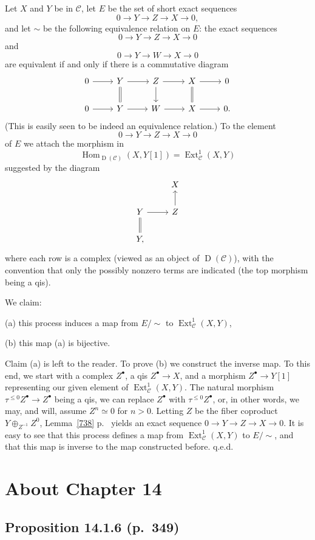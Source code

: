 \documentclass[12pt]{article}
\theoremstyle{remark}
\theoremstyle{definition}
\newcommand{\oo}{\operatorname}
\newcommand{\C}{\mathcal C}
\DeclareMathOperator{\Ext}{Ext}
\DeclareMathOperator{\Hom}{Hom}
\begin{document}
Let $X$ and $Y$ be in $\C$, let $E$ be the set of short exact sequences 
$$
0\to Y\to Z\to X\to0,
$$ 
and let $\sim$ be the following equivalence relation on $E$: the exact sequences 
$$
0\to Y\to Z\to X\to0
$$ 
and 
$$
0\to Y\to W\to X\to0
$$ 
are equivalent if and only if there is a commutative diagram 
$$
\begin{tikzcd}
0\ar{r}&Y\ar[equal]{d}\ar{r}&Z\ar{d}\ar{r}&X\ar[equal]{d}\ar{r}&0\\ 
0\ar{r}&Y\ar{r}&W\ar{r}&X\ar{r}&0.
\end{tikzcd}
$$ 
(This is easily seen to be indeed an equivalence relation.) To the element 
$$
0\to Y\to Z\to X\to0
$$ 
of $E$ we attach the morphism in 
$$
\Hom_{\oo D(\C)}(X,Y[1])=\Ext^1_\C(X,Y)
$$ 
suggested by the diagram 
$$
\begin{tikzcd}
{}&X\\ 
Y\ar[equal]{d}\ar{r}&Z\ar{u}\\ 
Y,
\end{tikzcd}
$$ 
where each row is a complex (viewed as an object of $\oo D(\C)$), with the convention that only the possibly nonzero terms are indicated (the top morphism being a qis). 

We claim: 

(a) this process induces a map from $E/\!\!\sim$ to $\Ext^1_\C(X,Y)$, 

(b) this map (a) is bijective. 

Claim (a) is left to the reader. To prove (b) we construct the inverse map. To this end, we start with a complex $Z^\bullet$, a qis $Z^\bullet\to X$, and a morphism $Z^\bullet\to Y[1]$ representing our given element of $\Ext^1_\C(X,Y)$. The natural morphism $\tau^{\le0}Z^\bullet\to Z^\bullet$ being a qis, we can replace $Z^\bullet$ with $\tau^{\le0}Z^\bullet$, or, in other words, we may, and will, assume $Z^n\simeq0$ for $n>0$. Letting $Z$ be the fiber coproduct $Y\oplus_{Z^{-1}}Z^0$, Lemma~\ref{738} p.~\pageref{738} yields an exact sequence $0\to Y\to Z\to X\to0$. It is easy to see that this process defines a map from $\Ext^1_\C(X,Y)$ to $E/\!\!\sim$, and that this map is inverse to the map constructed before. q.e.d.


\section{About Chapter 14}

\subsection{Proposition 14.1.6 (p.~349)}
\end{document}
